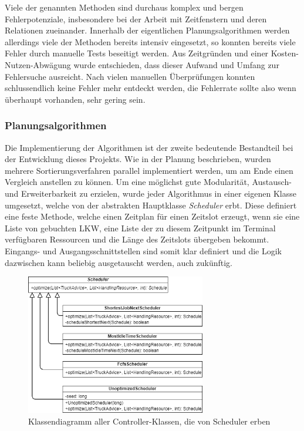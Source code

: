 Viele der genannten Methoden sind durchaus komplex und bergen Fehlerpotenziale, insbesondere bei der Arbeit mit Zeitfenstern und deren Relationen zueinander. Innerhalb der eigentlichen Planungsalgorithmen werden allerdings viele der Methoden bereits intensiv eingesetzt, so konnten bereits viele Fehler durch manuelle Tests beseitigt werden. Aus Zeitgründen und einer Kosten-Nutzen-Abwägung wurde entschieden, dass dieser Aufwand und Umfang zur Fehlersuche ausreicht. Nach vielen manuellen Überprüfungen konnten schlussendlich keine Fehler mehr entdeckt werden, die Fehlerrate sollte also wenn überhaupt vorhanden, sehr gering sein.



\subsubsection{Planungsalgorithmen}

Die Implementierung der Algorithmen ist der zweite bedeutende Bestandteil bei der Entwicklung dieses Projekts. Wie in der Planung beschrieben, wurden mehrere Sortierungsverfahren parallel implementiert werden, um am Ende einen Vergleich anstellen zu können. Um eine möglichst gute Modularität, Austausch- und Erweiterbarkeit zu erzielen, wurde jeder Algorithmus in einer eigenen Klasse umgesetzt, welche von der abstrakten Hauptklasse \textit{Scheduler} erbt. Diese definiert eine feste Methode, welche einen Zeitplan für einen Zeitslot erzeugt, wenn sie eine Liste von gebuchten LKW, eine Liste der zu diesem Zeitpunkt im Terminal verfügbaren Ressourcen und die Länge des Zeitslots übergeben bekommt. Eingangs- und Ausgangsschnittstellen sind somit klar definiert und die Logik dazwischen kann beliebig ausgetauscht werden, auch zukünftig.

\begin{figure}[H]
    \centering
    \includegraphics[width=0.7\textwidth]{images/classDiagrams/Scheduler_ClassDiagram.png}
    \caption{Klassendiagramm aller Controller-Klassen, die von Scheduler erben}
    \label{fig:classDiagramScheduler}
\end{figure}

